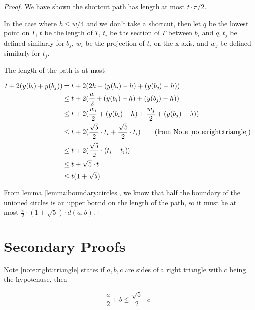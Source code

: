 \documentclass{tufte-handout}
\begin{document}
\begin{proof}

  We have shown the shortcut path has length at most $t \cdot \pi /
  2$.

  In the case where $h \le w/4$ and we don't take a shortcut, then let
  $q$ be the lowest point on $T$, $t$ be the length of $T$, $t_i$ be
  the section of $T$ between $b_i$ and $q$, $t_j$ be defined similarly
  for $b_j$, $w_i$ be the projection of $t_i$ on the x-axis, and $w_j$
  be defined similarly for $t_j$.

  The length of the path is at most

  \begin{align*}
    t + 2(y(b_i) + y(b_j)) &= t + 2(2h + (y(b_i) - h) + (y(b_j) - h)) \\
    &\le t + 2(\frac{w}{2} + (y(b_i) - h) + (y(b_j) - h)) \\
    &\le t + 2(\frac{w_i}{2} + (y(b_i) - h) + \frac{w_j}{2} + (y(b_j) - h)) \\
    &\le t + 2(\frac{\sqrt{5}}{2} \cdot t_i + \frac{\sqrt{5}}{2} \cdot t_i)
    \tag{from Note \ref{note:right:triangle}} \\
    &\le t + 2(\frac{\sqrt{5}}{2} \cdot (t_i + t_i)) \\
    &\le t + \sqrt{5} \cdot t \\
    &\le t (1 + \sqrt{5})
  \end{align*}

  From lemma \ref{lemma:boundary:circles}, we know that half the
  boundary of the unioned circles is an upper bound on the length of
  the path, so it must be at most $\frac{\pi}{2} \cdot (1 + \sqrt{5})
  \cdot d(a,b)$.

\end{proof}

\newpage

\section{Secondary Proofs}

Note \ref{note:right:triangle} states if $a,b,c$ are sides of a right
triangle with $c$ being the hypotenuse, then

\begin{displaymath}
  \frac{a}{2} + b \le \frac{\sqrt{5}}{2} \cdot c
\end{displaymath}
\end{document}
